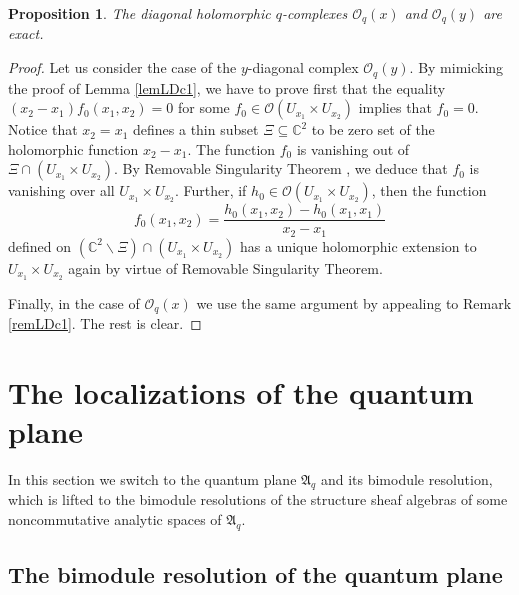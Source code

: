 \documentclass[12pt,reqno]{amsart}%
\theoremstyle{plain}
\newtheorem{proposition}{Proposition}
\numberwithin{theorem}{section} \numberwithin{equation}{section}
\numberwithin{lemma}{section}
\numberwithin{remark}{section}
\numberwithin{example}{section}
\numberwithin{proposition}{section}
\numberwithin{definition}{section}
\numberwithin{corollary}{section}
\begin{document}
\begin{proposition}
\label{propLDc1}The diagonal holomorphic $q$-complexes $\mathcal{O}_{q}\left(
x\right)  $ and $\mathcal{O}_{q}\left(  y\right)  $ are exact.
\end{proposition}

\begin{proof}
Let us consider the case of the $y$-diagonal complex $\mathcal{O}_{q}\left(
y\right)  $. By mimicking the proof of Lemma \ref{lemLDc1}, we have to prove
first that the equality $\left(  x_{2}-x_{1}\right)  f_{0}\left(  x_{1}%
,x_{2}\right)  =0$ for some $f_{0}\in\mathcal{O}\left(  U_{x_{1}}\times
U_{x_{2}}\right)  $ implies that $f_{0}=0$. Notice that $x_{2}=x_{1}$ defines
a thin subset $\Xi\subseteq\mathbb{C}^{2}$ to be zero set of the holomorphic
function $x_{2}-x_{1}$. The function $f_{0}$ is vanishing out of $\Xi
\cap\left(  U_{x_{1}}\times U_{x_{2}}\right)  $. By Removable Singularity
Theorem \cite[I.C.3]{GRo}, we deduce that $f_{0}$ is vanishing over all
$U_{x_{1}}\times U_{x_{2}}$. Further, if $h_{0}\in\mathcal{O}\left(  U_{x_{1}%
}\times U_{x_{2}}\right)  $, then the function%
\[
f_{0}\left(  x_{1},x_{2}\right)  =\frac{h_{0}\left(  x_{1},x_{2}\right)
-h_{0}\left(  x_{1},x_{1}\right)  }{x_{2}-x_{1}}%
\]
defined on $\left(  \mathbb{C}^{2}\backslash\Xi\right)  \cap\left(  U_{x_{1}%
}\times U_{x_{2}}\right)  $ has a unique holomorphic extension to $U_{x_{1}%
}\times U_{x_{2}}$ again by virtue of Removable Singularity Theorem.

Finally, in the case of $\mathcal{O}_{q}\left(  x\right)  $ we use the same
argument by appealing to Remark \ref{remLDc1}. The rest is clear.
\end{proof}

\section{The localizations of the quantum plane\label{sectionNL}}

In this section we switch to the quantum plane $\mathfrak{A}_{q}$ and its
bimodule resolution, which is lifted to the bimodule resolutions of the
structure sheaf algebras of some noncommutative analytic spaces of
$\mathfrak{A}_{q}$.

\subsection{The bimodule resolution of the quantum plane\label{subsecBRQP}}
\end{document}
